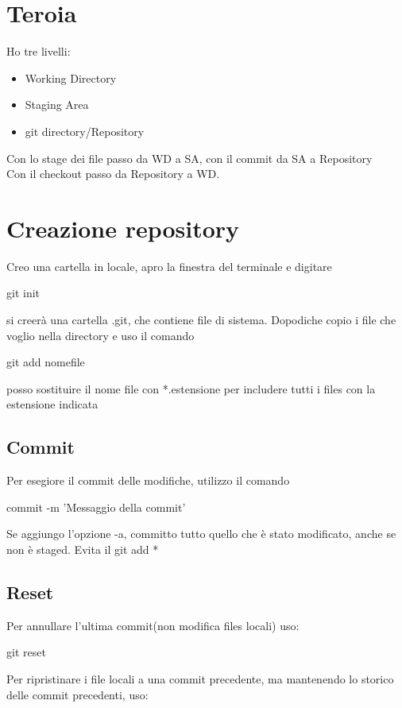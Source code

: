 \chapter{Teroia}
Ho tre livelli:
\begin{itemize}
\item Working Directory
\item Staging Area 
\item git directory/Repository
\end{itemize}
Con lo stage dei file passo da WD a SA, con il commit da SA a Repository\\
Con il checkout passo da Repository a WD.
 
\chapter{Creazione repository}
Creo una cartella in locale, apro la finestra del terminale e digitare 
\begin{tcolorbox}
git init
\end{tcolorbox}
si creerà una cartella .git, che contiene file di sistema.
Dopodiche copio i file che voglio nella directory e uso il comando

\begin{tcolorbox}
git add nomefile
\end{tcolorbox}
posso sostituire il nome file con *.estensione per includere tutti i files con la estensione indicata
\section{Commit}
Per esegiore il commit delle modifiche, utilizzo il comando

\begin{tcolorbox}
commit -m 'Messaggio della commit'
\end{tcolorbox}
Se aggiungo l'opzione -a, committo tutto quello che è stato modificato, anche se non è staged. Evita il git add *

\section{Reset}
Per annullare l'ultima commit(non modifica files locali) uso:

\begin{tcolorbox}
git reset
\end{tcolorbox}

Per ripristinare i file locali a una commit precedente, ma mantenendo lo storico delle commit precedenti, uso:

